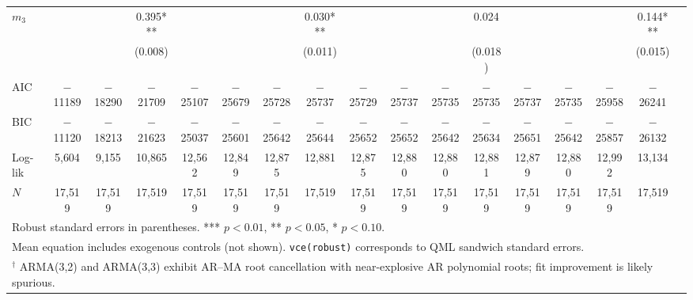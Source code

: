 \begin{table}[!htbp]
{\begin{tabular}{lcccccccccccccccc}
$m_{3}$ &  &  & 0.395*** &  &  &  & 0.030*** &  &  &  & 0.024   &  &  &  & 0.144*** \\
        &  &  & (0.008)  &  &  &  & (0.011)  &  &  &  & (0.018) &  &  &  & (0.015)  \\
\midrule
AIC     & $-$11189 & $-$18290 & $-$21709 & $-$25107 & $-$25679 & $-$25728 & $-$25737 & $-$25729 & $-$25737 & $-$25735 & $-$25735 & $-$25737 & $-$25735 & $-$25958 & $-$26241 \\
BIC     & $-$11120 & $-$18213 & $-$21623 & $-$25037 & $-$25601 & $-$25642 & $-$25644 & $-$25652 & $-$25652 & $-$25642 & $-$25634 & $-$25651 & $-$25642 & $-$25857 & $-$26132 \\
Log-lik & 5{,}604  & 9{,}155  & 10{,}865 & 12{,}562 & 12{,}849 & 12{,}875 & 12{,}881 & 12{,}875 & 12{,}880 & 12{,}880 & 12{,}881 & 12{,}879 & 12{,}880 & 12{,}992 & 13{,}134 \\
$N$     & 17{,}519 & 17{,}519 & 17{,}519 & 17{,}519 & 17{,}519 & 17{,}519 & 17{,}519 & 17{,}519 & 17{,}519 & 17{,}519 & 17{,}519 & 17{,}519 & 17{,}519 & 17{,}519 & 17{,}519 \\
\bottomrule
\multicolumn{16}{l}{\footnotesize Robust standard errors in parentheses. *** $p<0.01$, ** $p<0.05$, * $p<0.10$.} \\
\multicolumn{16}{l}{\footnotesize Mean equation includes exogenous controls (not shown). \texttt{vce(robust)} corresponds to QML sandwich standard errors.} \\
\multicolumn{16}{l}{\footnotesize $^\dagger$ ARMA(3,2) and ARMA(3,3) exhibit AR--MA root cancellation with near-explosive AR polynomial roots; fit improvement is likely spurious.} \\
\end{tabular}%
}
\end{table}
